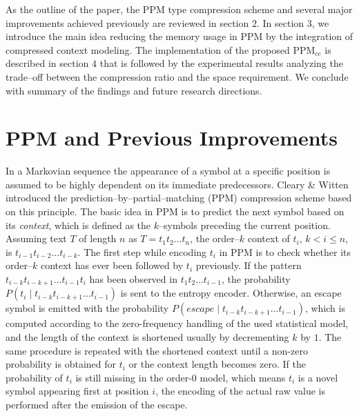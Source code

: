 \documentclass[runningheads,a4paper]{llncs}
\begin{document}
As the outline of the paper, the PPM type compression scheme and several major improvements achieved previously 
are reviewed in section $2$. 
In section $3$, we introduce the main idea reducing the memory usage in PPM by the integration of  compressed
context modeling. 
The implementation of the proposed PPM$_{cc}$ is described in section $4$ that is followed by the experimental results
analyzing the trade--off between the compression ratio and the space requirement. 
We conclude with summary of the findings and future research directions.


\section{PPM and Previous Improvements}

In a Markovian sequence the appearance of a symbol at a specific position is assumed to be highly dependent on its
immediate predecessors. 
Cleary \& Witten \cite{CW84} introduced the prediction--by--partial--matching ({PPM}) compression scheme based on this
principle. 
The basic idea in PPM is to predict the next symbol based on its \emph{context}, which is defined as the
$k$--symbols preceding the current position. 
Assuming text $T$ of length $n$ as $T=t_1t_2 \ldots t_n$, the order--$k$ context of $t_i$, $ k < i \leq n$, is
$t_{i-1}t_{i-2} \ldots t_{i-k}$. 
The first step while encoding $t_i$ in PPM is to check whether its order--$k$ context has ever been followed by $t_i$
previously.
If the pattern $t_{i-k}t_{i-k+1} \ldots t_{i-1}t_i$ has been observed in $t_1t_2 \ldots t_{i-1}$, the probability
$P(t_i \;|\; t_{i-k}t_{i-k+1} \ldots t_{i-1})$ is sent to the entropy encoder. 
Otherwise, an escape symbol is emitted with the probability $P( escape \;|\; t_{i-k}t_{i-k+1} \ldots t_{i-1})$, which 
is computed according to the zero-frequency handling of the used statistical model, and the length of the context is
shortened usually by decrementing $k$ by $1$.
The same procedure is repeated with the shortened context until a non-zero probability is obtained for $t_i$ 
or the context length becomes zero. If the probability of $t_i$ is still missing in the order-$0$ model, which means
$t_i$ is a novel symbol appearing first at position $i$, the encoding of the actual raw value is
performed after the emission of the escape. 
\end{document}
